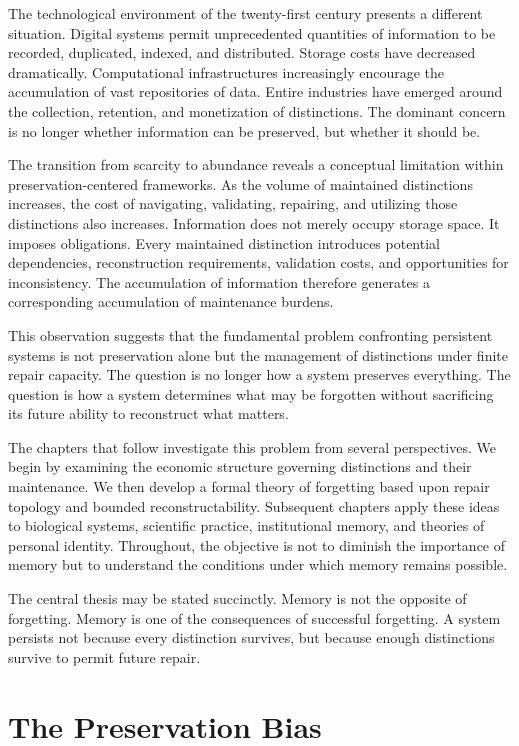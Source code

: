 \documentclass[12pt,oneside]{book}
\theoremstyle{plain} \newtheorem{theorem}{Theorem}[chapter] \newtheorem{lemma}[theorem]{Lemma} \newtheorem{proposition}[theorem]{Proposition} \newtheorem{corollary}[theorem]{Corollary}
\theoremstyle{definition} \newtheorem{definition}[theorem]{Definition} \newtheorem{axiom}[theorem]{Axiom} \newtheorem{construction}[theorem]{Construction}
\theoremstyle{remark} \newtheorem{remark}[theorem]{Remark} \newtheorem{example}[theorem]{Example}
\begin{document}
The technological environment of the twenty-first century presents a different situation. Digital systems permit unprecedented quantities of information to be recorded, duplicated, indexed, and distributed. Storage costs have decreased dramatically. Computational infrastructures increasingly encourage the accumulation of vast repositories of data. Entire industries have emerged around the collection, retention, and monetization of distinctions. The dominant concern is no longer whether information can be preserved, but whether it should be.

The transition from scarcity to abundance reveals a conceptual limitation within preservation-centered frameworks. As the volume of maintained distinctions increases, the cost of navigating, validating, repairing, and utilizing those distinctions also increases. Information does not merely occupy storage space. It imposes obligations. Every maintained distinction introduces potential dependencies, reconstruction requirements, validation costs, and opportunities for inconsistency. The accumulation of information therefore generates a corresponding accumulation of maintenance burdens.

This observation suggests that the fundamental problem confronting persistent systems is not preservation alone but the management of distinctions under finite repair capacity. The question is no longer how a system preserves everything. The question is how a system determines what may be forgotten without sacrificing its future ability to reconstruct what matters.

The chapters that follow investigate this problem from several perspectives. We begin by examining the economic structure governing distinctions and their maintenance. We then develop a formal theory of forgetting based upon repair topology and bounded reconstructability. Subsequent chapters apply these ideas to biological systems, scientific practice, institutional memory, and theories of personal identity. Throughout, the objective is not to diminish the importance of memory but to understand the conditions under which memory remains possible.

The central thesis may be stated succinctly. Memory is not the opposite of forgetting. Memory is one of the consequences of successful forgetting. A system persists not because every distinction survives, but because enough distinctions survive to permit future repair.

\chapter{The Preservation Bias}
\end{document}
